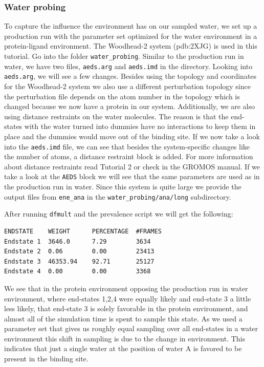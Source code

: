 \subsubsection{Water probing}
To capture the influence the environment has on our sampled water, we set up a production run with the parameter set optimized for the water environment in a protein-ligand environment. The Woodhead-2 system (pdb:2XJG\cite{woodhead2}) is used in this tutorial. Go into the folder \texttt{water\_probing}. Similar to the production run in water, we have two files, \texttt{aeds.arg} and \texttt{aeds.imd} in the directory. Looking into \texttt{aeds.arg}, we will see a few changes. Besides using the topology and coordinates for the Woodhead-2 system we also use a different perturbation topology since the perturbation file depends on the atom number in the topology which is changed because we now have a protein in our system. Additionally, we are also using distance restraints on the water molecules. The reason is that the end-states with the water turned into dummies have no interactions to keep them in place and the dummies would move out of the binding site. If we now take a look into the \texttt{aeds.imd} file, we can see that besides the system-specific changes like the number of atoms, a distance restraint block is added. For more information about distance restraints read Tutorial 2 or check in the GROMOS manual. If we take a look at the \texttt{AEDS} block we will see that the same parameters are used as in the production run in water. Since this system is quite large we provide the output files from \texttt{ene\_ana} in the \texttt{water\_probing/ana/long} subdirectory.

After running \texttt{dfmult} and the prevalence script we will get the following:

\begin{lstlisting}
ENDSTATE    WEIGHT      PERCENTAGE  #FRAMES
Endstate 1  3646.0      7.29        3634
Endstate 2  0.06        0.00        23413
Endstate 3  46353.94    92.71       25127
Endstate 4  0.00        0.00        3368
\end{lstlisting}

We see that in the protein environment opposing the production run in water environment, where end-states 1,2,4 were equally likely and end-state 3 a little less likely, that end-state 3 is solely favorable in the protein environment, and almost all of the simulation time is spent to sample this state. As we used a parameter set that gives us roughly equal sampling over all end-states in a water environment this shift in sampling is due to the change in environment. This indicates that just a single water at the position of water A is favored to be present in the binding site.

